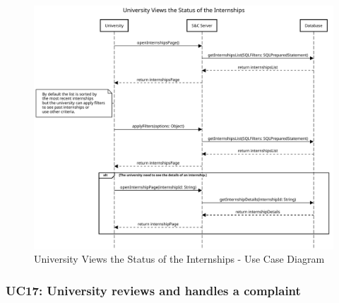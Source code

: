 \begin{figure}[H]
    \centering
    \includegraphics[width=1.0\textwidth]{Images/UC_15.pdf}
    \caption{University Views the Status of the Internships - Use Case Diagram}
    \label{fig:use-case-diagram-16}
\end{figure}


\subsubsection{UC17: University reviews and handles a complaint}
\label{subsubsec:university-reviews-and-handles-a-complaint}

